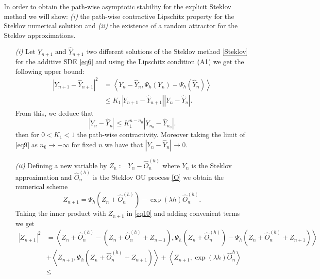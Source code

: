     \begin{Proof}
      In order to obtain the path-wise asymptotic stability for the explicit Steklov
      method we will show: {\it (i)} the path-wise contractive Lipschitz property for the
      Steklov numerical solution and {\it (ii)} the existence of a random attractor for
      the Steklov approximations.
      \begin{enumerate}
	\item[{\it(i)}]
	  Let $Y_{n+1}$ and $\widehat{Y}_{n+1}$ two different solutions of 
	  the Steklov method \eqref{Steklov} for the additive SDE \eqref{eq6} and using
	  the Lipschitz condition (A1) we get the following upper bound:
	  \begin{align*}
	    |Y_{n+1}-\widehat{Y}_{n+1}|^2
	    &=
	      \left\langle
		Y_{n}-\widehat{Y}_{n},\Psi_h(Y_n)-\Psi_h(\widehat{Y}_n)
	      \right\rangle\\
	    &
	    \leq
	      K_1|Y_{n+1}-\widehat{Y}_{n+1}||Y_{n}-\widehat{Y}_{n}|.
	  \end{align*}
	  From this, we deduce that
	  \begin{equation}\label{eq9}
	    |Y_{n}-\widehat{Y}_{n}|\leq K_1^{n-n_0}|Y_{n_0}-\widehat{Y}_{n_0}|.
	  \end{equation}
	  then for $0<K_1<1$ the path-wise contractivity. Moreover taking the limit of
	  \eqref{eq9} as $n_0\to -\infty $ for fixed $n$ we have that
	  $|Y_{n}-\widehat{Y}_{n}|\to 0$.
	\item[{\it(ii)}]
	  Defining a new variable by  $Z_n:=Y_n-\widehat{O}_n^{(h)}$ where 
	  $Y_n$ is the Steklov approximation and $\widehat{O}_n^{(h)}$ is the Steklov OU
	  process \eqref{O} we obtain the numerical scheme
	  \begin{equation}\label{eq10}
	    Z_{n+1}=\Psi_h(Z_n+\widehat{O}_n^{(h)}) -\exp(\lambda h)\widehat{O}_n^{(h)}.
	  \end{equation}
	Taking the inner product with $Z_{n+1}$ in \eqref{eq10} and adding convenient
	terms we get
	\begin{align*}
	|Z_{n+1}|^2
	    &=
	   \left\langle
	      Z_n+\widehat{O}_n^{(h)}-(Z_n+\widehat{O}_n^{(h)}+Z_{n+1}),
	    \Psi_h(Z_n+\widehat{O}_n^{(h)})-\Psi_h(Z_n+\widehat{O}_n^{(h)}+Z_{n+1})
	    \right\rangle\\
	    &+
	    \left\langle
	      Z_{n+1},
	    \Psi_h(Z_n+\widehat{O}_n^{(h)}+Z_{n+1})
	    \right\rangle
	    +
	    \left\langle
	      Z_{n+1},
	      \exp{(\lambda h)}\widehat{O}^{h}_n
	    \right\rangle\\
	    &\leq

\end{align*}
\end{enumerate}
\end{Proof}
